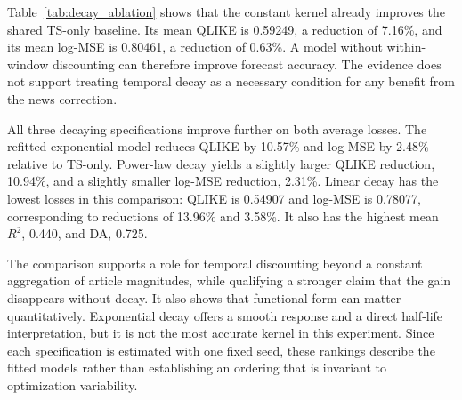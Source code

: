 Table~\ref{tab:decay_ablation} shows that the constant kernel already
improves the shared TS-only baseline. Its mean QLIKE is 0.59249,
a reduction of 7.16\%, and its mean log-MSE is 0.80461,
a reduction of 0.63\%. A model without within-window discounting
can therefore improve forecast accuracy. The evidence does not
support treating temporal decay as a necessary condition for any
benefit from the news correction.

All three decaying specifications improve further on both average
losses. The refitted exponential model reduces QLIKE by 10.57\%
and log-MSE by 2.48\% relative to TS-only. Power-law decay yields
a slightly larger QLIKE reduction, 10.94\%, and a slightly smaller
log-MSE reduction, 2.31\%. Linear decay has the lowest losses in
this comparison: QLIKE is 0.54907 and log-MSE is 0.78077,
corresponding to reductions of 13.96\% and 3.58\%. It also has
the highest mean $R^2$, 0.440, and DA, 0.725.

The comparison supports a role for temporal discounting beyond a
constant aggregation of article magnitudes, while qualifying a
stronger claim that the gain disappears without decay. It also
shows that functional form can matter quantitatively. Exponential
decay offers a smooth response and a direct half-life interpretation,
but it is not the most accurate kernel in this experiment. Since
each specification is estimated with one fixed seed, these rankings
describe the fitted models rather than establishing an ordering
that is invariant to optimization variability.
